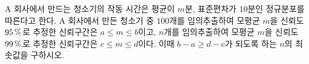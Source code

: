 A 회사에서 만드는 청소기의 작동 시간은 평균이 $m$분, 표준편차가 $10$분인 정규분포를 따른다고 한다. A 회사에서 만든 청소기 중 $100$개를 임의추출하여 모평균 $m$을 신뢰도 $95\mkern3mu \%$로 추정한 신뢰구간은 $a\le m\le b$이고, $n$개를 임의추출하여 모평균 $m$을 신뢰도 $99\mkern3mu \%$로 추정한 신뢰구간은 $c\le m\le d$이다. 이때 $b-a\ge d-c$가 되도록 하는 $n$의 최솟값을 구하시오. 
